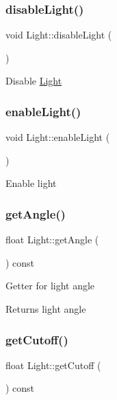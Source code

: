 \subsubsection{\texorpdfstring{disable\+Light()}{disableLight()}}
{\footnotesize\ttfamily void Light\+::disable\+Light (\begin{DoxyParamCaption}{ }\end{DoxyParamCaption})}

Disable \hyperlink{classLight}{Light} \mbox{\label{classLight_a4a605e1a566089fb330938b0e7820185}} 
\subsubsection{\texorpdfstring{enable\+Light()}{enableLight()}}
{\footnotesize\ttfamily void Light\+::enable\+Light (\begin{DoxyParamCaption}{ }\end{DoxyParamCaption})}

Enable light \mbox{\label{classLight_a1a69147d826c7ab474a56d91b5845c47}} 
\subsubsection{\texorpdfstring{get\+Angle()}{getAngle()}}
{\footnotesize\ttfamily float Light\+::get\+Angle (\begin{DoxyParamCaption}{ }\end{DoxyParamCaption}) const}

Getter for light angle \begin{DoxyReturn}{Returns}
light angle 
\end{DoxyReturn}
\mbox{\label{classLight_a73794614318f137338f87bd773739f78}} 
\subsubsection{\texorpdfstring{get\+Cutoff()}{getCutoff()}}
{\footnotesize\ttfamily float Light\+::get\+Cutoff (\begin{DoxyParamCaption}{ }\end{DoxyParamCaption}) const}

